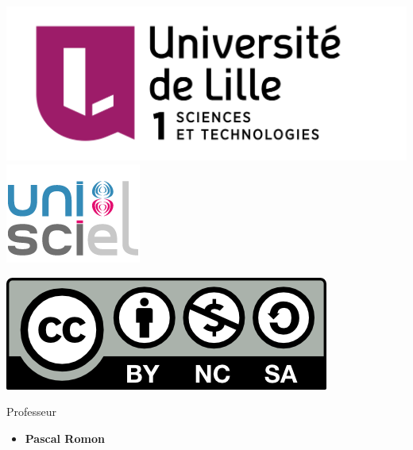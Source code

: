 





\begin{frame}

\thispagestyle{empty}    

  \hspace*{-20ex}
  \begin{minipage}{0.35\textwidth}
  \begin{center}
    \vspace*{5ex}   


    \bigskip

    \includegraphics[scale=0.13]{../divers/Logo-Univ-Lille-1-new.png} 
    \quad
    \includegraphics[scale=0.3]{../divers/logo-unisciel.png}

    \vspace*{5ex}

    \includegraphics[scale=0.5]{../divers/by-nc-sa.png}
  \end{center}
  \end{minipage}
  \hfil
  \begin{minipage}{0.90\textwidth}
  \footnotesize
   \vspace*{2ex}
  Professeur
  \begin{itemize}
    \item {\bf Pascal Romon}  
  \end{itemize} 
  

\end{minipage}
\end{frame}
